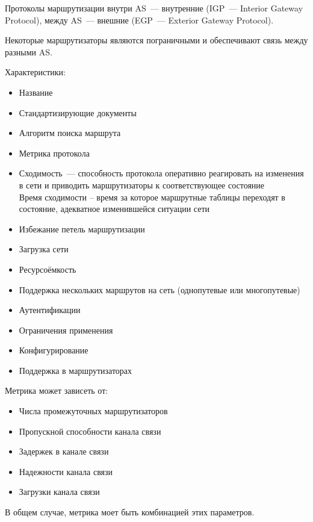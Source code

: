 Протоколы маршрутизации внутри AS~--- внутренние (IGP~--- Interior Gateway Protocol), между AS~--- внешние (EGP~--- Exterior Gateway Protocol).

Некоторые маршрутизаторы являются пограничными и обеспечивают связь между разными AS.


Характеристики:
\begin{itemize}
    \item Название 
    \item Стандартизирующие документы
    \item Алгоритм поиска маршрута
    \item Метрика протокола
    \item Сходимость~--- способность протокола оперативно реагировать на изменения в сети и приводить маршрутизаторы к соответствующее состояние\\
    Время сходимости – время за которое маршрутные таблицы переходят в состояние, адекватное изменившейся ситуации сети
    \item Избежание петель маршрутизации
    \item Загрузка сети
    \item Ресурсоёмкость
    \item Поддержка нескольких маршрутов на сеть (однопутевые или многопутевые)
    \item Аутентификации
    \item Ограничения применения
    \item Конфигурирование
    \item Поддержка в маршрутизаторах
\end{itemize}


Метрика может зависеть от:
\begin{itemize}
    \item Числа промежуточных маршрутизаторов
    \item Пропускной способности канала связи
    \item Задержек в канале связи
    \item Надежности канала связи
    \item Загрузки канала связи
\end{itemize}

В общем случае, метрика моет быть комбинацией этих параметров.


